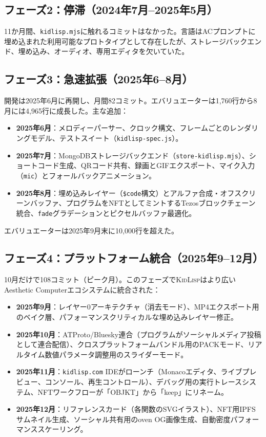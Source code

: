\documentclass[10pt,letterpaper,twocolumn]{article}
\newcommand{\kidlisp}{\textsc{KidLisp}}
\begin{document}
\subsection{フェーズ2：停滞（2024年7月--2025年5月）}

11か月間、\texttt{kidlisp.mjs}に触れるコミットはなかった。言語はACプロンプトに埋め込まれた利用可能なプロトタイプとして存在したが、ストレージバックエンド、埋め込み、オーディオ、専用エディタを欠いていた。

\subsection{フェーズ3：急速拡張（2025年6--8月）}

開発は2025年6月に再開し、月間82コミット。エバリュエーターは1,760行から8月には4,965行に成長した。主な追加：

\begin{itemize}
  \item \textbf{2025年6月}：メロディーパーサー、クロック構文、フレームごとのレンダリングモデル、テストスイート（\texttt{kidlisp-spec.js}）。
  \item \textbf{2025年7月}：MongoDBストレージバックエンド（\texttt{store-kidlisp.mjs}）、ショートコード生成、QRコード共有、録画とGIFエクスポート、マイク入力（\texttt{mic}）とフォールバックアニメーション。
  \item \textbf{2025年8月}：埋め込みレイヤー（\texttt{\$code}構文）とアルファ合成・オフスクリーンバッファ、プログラムをNFTとしてミントするTezosブロックチェーン統合、\texttt{fade}グラデーションとピクセルバッファ最適化。
\end{itemize}

エバリュエーターは2025年9月末に10,000行を超えた。

\subsection{フェーズ4：プラットフォーム統合（2025年9--12月）}

10月だけで108コミット（ピーク月）。このフェーズで\kidlisp{}はより広いAesthetic Computerエコシステムに統合された：

\begin{itemize}
  \item \textbf{2025年9月}：レイヤー0アーキテクチャ（消去モード）、MP4エクスポート用のベイク層、パフォーマンスクリティカルな埋め込みレイヤー修正。
  \item \textbf{2025年10月}：ATProto/Bluesky連合（プログラムがソーシャルメディア投稿として連合配信）、クロスプラットフォームバンドル用のPACKモード、リアルタイム数値パラメータ調整用のスライダーモード。
  \item \textbf{2025年11月}：\texttt{kidlisp.com} IDEがローンチ（Monacoエディタ、ライブプレビュー、コンソール、再生コントロール）、デバッグ用の実行トレースシステム、NFTワークフローが「OBJKT」から「keep」にリネーム。
  \item \textbf{2025年12月}：リファレンスカード（各関数のSVGイラスト）、NFT用IPFSサムネイル生成、ソーシャル共有用のoven OG画像生成、自動密度パフォーマンススケーリング。
\end{itemize}
\end{document}
